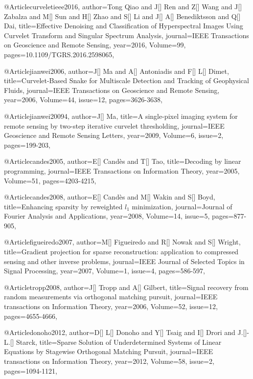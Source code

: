 {@Article{curveletieee2016,
  author={Tong Qiao and J[] Ren and Z[] Wang and J[] Zabalza and M[] Sun and H[] Zhao and S[] Li and J[] A[] Benediktsson and Q[] Dai},
  title={Effective Denoising and Classification of Hyperspectral Images Using Curvelet Transform and Singular Spectrum Analysis},
  journal={IEEE Transactions on Geoscience and Remote Sensing},
  year=2016,
  Volume=99,
  pages={10.1109/TGRS.2016.2598065},
}



@Article{jianwei2006,
  author={J[] Ma and A[] Antoniadis and F[] L[] Dimet},
  title={Curvelet-Based Snake for Multiscale Detection and Tracking of Geophysical Fluids},
  journal={IEEE Transactions on Geoscience and Remote Sensing},
  year=2006,
  Volume=44,
  issue=12,
  pages={3626-3638},
}

@Article{jianwei20094,
  author={J[] Ma},
  title={A single-pixel imaging system for remote sensing by two-step iterative curvelet
thresholding},
  journal={IEEE Geoscience and Remote Sensing Letters},
  year=2009,
  Volume=6,
  issue=2,
  pages={199-203},
}

@Article{candes2005,
  author={E[] Cand\`{e}s and T[] Tao},
  title={Decoding by linear programming},
  journal={IEEE Transactions on Information Theory},
  year=2005,
  Volume=51,
  pages={4203-4215},
}

@Article{candes2008,
  author={E[] Cand\`{e}s and M[] Wakin and S[] Boyd},
  title={Enhancing sparsity by reweighted $l_1$ minimization},
  journal={Journal of Fourier Analysis and Applications},
  year=2008,
  Volume=14,
  issue=5,
  pages={877-905},
}

@Article{figueiredo2007,
  author={M[] Figueiredo and R[] Nowak and S[] Wright},
  title={Gradient projection for sparse reconstruction: application to compressed sensing and other inverse problems},
  journal={IEEE Journal of Selected Topics in Signal Processing},
  year=2007,
  Volume=1,
  issue=4,
  pages={586-597},
}


@Article{tropp2008,
  author={J[] Tropp and A[] Gilbert},
  title={Signal recovery from random measurements via orthogonal matching pursuit},
  journal={IEEE transactions on Information Theory},
  year=2006,
  Volume=52,
  issue=12,
  pages={4655-4666},
}


@Article{donoho2012,
  author={D[] L[] Donoho and Y[] Tsaig and I[] Drori and J.[]-L.[] Starck},
  title={Sparse Solution of Underdetermined Systems of Linear Equations by Stagewise Orthogonal Matching Pursuit},
  journal={IEEE transactions on Information Theory},
  year=2012,
  Volume=58,
  issue=2,
  pages={1094-1121},
}

}
